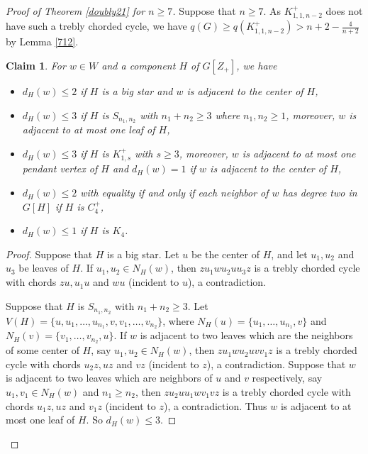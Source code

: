 \documentclass[12pt]{article}
\newtheorem {claim}{Claim}[section]
\begin{document}
\begin{proof}[Proof of Theorem \ref{doubly21} for $n\ge 7$]
Suppose that $n\ge 7$.
As $K_{1,1,n-2}^+$ does not have such a trebly chorded cycle, we have $q(G)\ge q(K_{1,1,n-2}^+)>n+2-\frac{4}{n+2}$ by Lemma \ref{712}.







\begin{claim}\label{c31}
For $w\in W$ and a component $H$ of $G[Z_+]$, we have
\begin{itemize}
\item $d_H(w)\le 2$ if $H$ is a big star and $w$ is adjacent to the center of $H$,
\item $d_H(w)\le 3$ if $H$ is $S_{n_1,n_2}$ with $n_1+n_2\ge 3$ where $n_1,n_2\ge1$, moreover, $w$ is adjacent to at most one leaf of $H$,
\item $d_H(w)\le 3$ if $H$ is $K_{1,s}^+$ with $s\ge 3$, moreover, $w$ is adjacent to at most one pendant vertex of $H$ and $d_H(w)=1$ if $w$ is adjacent to the center of $H$,
\item $d_H(w)\le 2$ with equality if and only if each neighbor of $w$ has degree two in $G[H]$ if $H$ is $C_4^+$,
\item $d_H(w)\le 1$ if $H$ is $K_4$.
 \end{itemize}
\end{claim}

\begin{proof}
Suppose that $H$ is a big star.
Let $u$ be the center of $H$, and let $u_1,u_2$ and $u_3$ be leaves of $H$.
If $u_1,u_2\in N_{H}(w)$, then $zu_1wu_2uu_3z$ is a trebly chorded cycle with  chords $zu, u_1u$ and $wu$ (incident to $u$), a contradiction.

Suppose that $H$ is $S_{n_1,n_2}$ with $n_1+n_2\ge 3$. Let $V(H)=\{u,u_1,\dots,u_{n_1},v,v_1,\dots,v_{n_2}\}$, where $N_H(u)=\{u_1,\dots,u_{n_1},v\}$ and $N_H(v)=\{v_1,\dots,v_{n_2},u\}$.
If $w$ is adjacent to two leaves which are the neighbors of some center of $H$, say $u_1,u_2\in N_{H}(w)$, then $zu_1wu_2uvv_1z$ is a trebly chorded cycle with  chords $u_2z, uz$ and $vz$ (incident to $z$), a contradiction.
Suppose that $w$ is adjacent to two leaves which are neighbors of $u$ and $v$ respectively, say  $u_1,v_1\in N_{H}(w)$ and $n_1\ge n_2$, then $zu_2uu_1wv_1vz$ is a trebly chorded cycle with  chords $u_1z, uz$ and $v_1z$ (incident to $z$), a contradiction.
Thus $w$ is adjacent to at most one leaf of $H$.
So $d_H(w)\le 3$.


\end{proof}
\end{proof}
\end{document}
